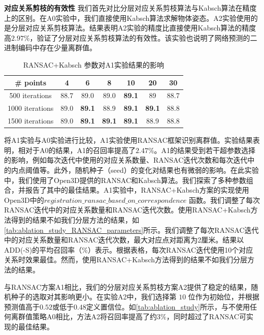 

\textbf{对应关系剪枝的有效性 }
我们首先对比分层对应关系剪枝算法与Kabsch算法在精度上的区别。在A0实验中，我们直接使用Kabsch算法求解物体姿态。A2实验使用的是分层对应关系剪枝算法。结果表明A2实验的精度比直接使用Kabsch算法的精度高$2.97\%$，验证了分层对应关系剪枝算法的有效性。该实验也说明了网络预测的二进制编码中存在少量离群值。

\begin{table}
  \centering
  \begin{tabular}{@{}c|c|c|c|c|c|c@{}}
    \toprule
     \# points  & 4 & 6 & 8 & 10 & 20 & 30 \\
     \midrule
     500 iterations & 88.7 & 89.0 & 89.0	& \textbf{89.1} & 89 & 88.7 \\
     1000 iterations & 89.0 & \textbf{89.1} & 88.9 & \textbf{89.1} & \textbf{89.1} & 88.8 \\
     1500 iterations & 89.0 & \textbf{89.1} & \textbf{89.1} & \textbf{89.1} & 88.9 & 88.8 \\
    \bottomrule
  \end{tabular}
  \caption{RANSAC+Kabsch 参数对A1实验结果的影响}
  \label{tab:ablation_study_RANSAC_parameters}
\end{table}

将A1实验与A0实验进行比较，A1实验使用RANSAC框架识别离群值。实验结果表明，相对于A0的结果，A1的召回率提高了$2.47\%$。A1的结果受到若干超参数选择的影响，例如每次迭代中使用的对应关系数量、RANSAC迭代次数和每次迭代中的内点阈值等。此外，随机种子（seed）的变化对结果也有微弱的影响。在此实验中，我们使用了Open3D\cite{zhou2018open3d}提供的RANSAC和Kabsch算法。我们探索了多种参数组合，并报告了其中的最佳结果。A1实验中，RANSAC+Kabsch方案的实现使用Open3D中的$registration\_ransac\_based\_on\_correspondence$ 函数。我们调整了每次RANSAC迭代中的对应关系数量和RANSAC迭代次数。使用RANSAC+Kabsch方法得到的结果不如我们分层方法的结果，如\autoref{tab:ablation_study_RANSAC_parameters}所示。我们调整了每次RANSAC迭代中的对应关系数量和RANSAC迭代次数，最大对应点对距离为2厘米。结果以ADD(-S)的平均召回率（\%）表示。根据表格，每次RANSAC迭代使用10个对应关系时效果最佳。然而，使用RANSAC+Kabsch方法得到的结果不如我们分层方法的结果。

与RANSAC方案A1相比，我们的分层对应关系剪枝方案A2提供了稳定的结果，随机种子的选取对其影响更小。在实验A2中，我们选择第 $10$ 位作为初始位，并根据预测值高于$0.52$或低于$0.48$定义置信位。如\autoref{tab:ablation_study}所示，与不使用任何离群值策略A0相比，方法A2将召回率提高了约$3\%$，同时超过了RANSAC可实现的最佳结果。

